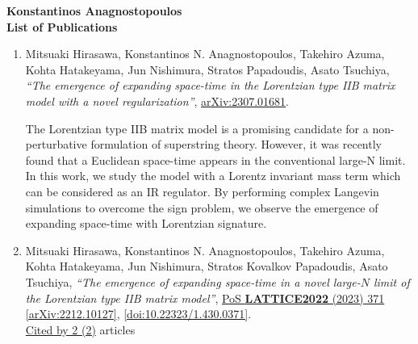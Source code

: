 \documentclass[a4paper,10pt]{article}
\begin{document}
\begin{center}
{\Large\bf Konstantinos Anagnostopoulos}\\
{\large\bf List of Publications}
\end  {center}
\begin{enumerate}
\item Mitsuaki Hirasawa, Konstantinos N. Anagnostopoulos, Takehiro Azuma, Kohta Hatakeyama, Jun Nishimura, Stratos Papadoudis, Asato Tsuchiya, {\it ``The emergence of expanding space-time in the Lorentzian type IIB matrix model with a novel regularization''}, \href{https://arxiv.org/abs/2307.01681}{arXiv:2307.01681}.

The Lorentzian type IIB matrix model is a promising candidate for a non-perturbative formulation of superstring theory. However, it was recently found that a Euclidean space-time appears in the conventional large-N limit. In this work, we study the model with a Lorentz invariant mass term which can be considered as an IR regulator. By performing complex Langevin simulations to overcome the sign problem, we observe the emergence of expanding space-time with Lorentzian signature.
\item Mitsuaki Hirasawa, Konstantinos N. Anagnostopoulos, Takehiro Azuma, Kohta Hatakeyama, Jun Nishimura, Stratos Kovalkov Papadoudis, Asato Tsuchiya, {\it ``The emergence of expanding space-time in a novel large-$N$ limit of the Lorentzian type IIB matrix model''}, \href{https://www.doi.org/10.22323/1.430.0371}{PoS {\bf LATTICE2022} (2023) 371} \href{https://arxiv.org/abs/2212.10127}{[arXiv:2212.10127]}, \href{https://www.doi.org/10.22323/1.430.0371}{[doi:10.22323/1.430.0371]}.
\\\href{https://inspirehep.net/literature/?q=refersto%3Arecid%3A2616279}{Cited by 2 (2)} articles


\end{enumerate}
\end{document}
